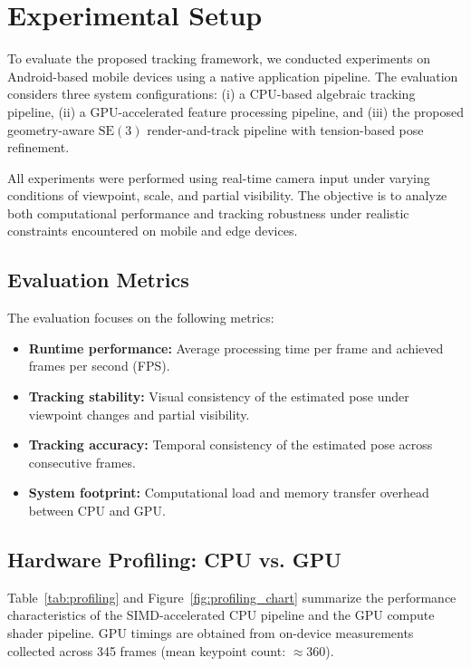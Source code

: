 \section{Experimental Setup}

To evaluate the proposed tracking framework, we conducted experiments on Android-based mobile devices using a native application pipeline. The evaluation considers three system configurations: (i) a CPU-based algebraic tracking pipeline, (ii) a GPU-accelerated feature processing pipeline, and (iii) the proposed geometry-aware $\mathrm{SE}(3)$ render-and-track pipeline with tension-based pose refinement.

All experiments were performed using real-time camera input under varying conditions of viewpoint, scale, and partial visibility. The objective is to analyze both computational performance and tracking robustness under realistic constraints encountered on mobile and edge devices.

\subsection{Evaluation Metrics}

The evaluation focuses on the following metrics:

\begin{itemize}
    \item \textbf{Runtime performance:} Average processing time per frame and achieved frames per second (FPS).
    \item \textbf{Tracking stability:} Visual consistency of the estimated pose under viewpoint changes and partial visibility.
    \item \textbf{Tracking accuracy:} Temporal consistency of the estimated pose across consecutive frames.
    \item \textbf{System footprint:} Computational load and memory transfer overhead between CPU and GPU.
\end{itemize}

\subsection{Hardware Profiling: CPU vs. GPU}

Table~\ref{tab:profiling} and Figure~\ref{fig:profiling_chart} summarize the performance characteristics of the SIMD-accelerated CPU pipeline and the GPU compute shader pipeline. GPU timings are obtained from on-device measurements collected across 345 frames (mean keypoint count: $\approx$360).


